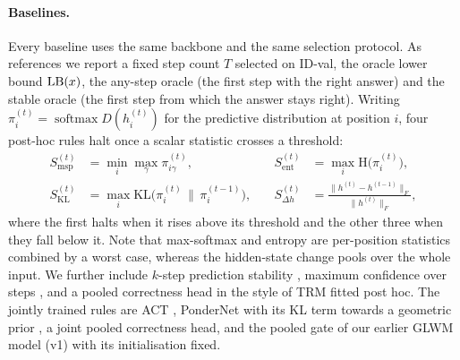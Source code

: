 \paragraph{Baselines.} Every baseline uses the same backbone and the same selection protocol. As
references we report a fixed step count $T$ selected on ID-val, the oracle lower bound $\operatorname{LB}(x)$, the
any-step oracle (the first step with the right answer) and the stable oracle (the first step from which
the answer stays right). Writing $\pi_i^{(t)} = \operatorname{softmax}D(h_i^{(t)})$ for the predictive
distribution at position $i$, four post-hoc rules halt once a scalar statistic crosses a threshold:
\begin{equation}
  \begin{aligned}
    S_{\mathrm{msp}}^{(t)} &= \min_i \max_\gamma \pi_{i\gamma}^{(t)}, &\quad
    S_{\mathrm{ent}}^{(t)} &= \max_i \mathrm{H}\bigl(\pi_i^{(t)}\bigr),\\
    S_{\mathrm{KL}}^{(t)} &= \max_i \mathrm{KL}\bigl(\pi_i^{(t)}\,\big\|\,\pi_i^{(t-1)}\bigr), &\quad
    S_{\Delta h}^{(t)} &= \frac{\lVert h^{(t)}-h^{(t-1)}\rVert_F}{\lVert h^{(t)}\rVert_F},
  \end{aligned}
  \label{eq:posthoc}
\end{equation}
where the first halts when it rises above its threshold and the other three when they fall below it.
Note that max-softmax and entropy are per-position statistics combined by a worst case, whereas the
hidden-state change pools over the whole input. We further include $k$-step prediction stability
\citep{zhou2020pabee}, maximum confidence over steps \citep{fan2025looped}, and a pooled correctness head
in the style of TRM \citep{jolicoeur2025trm} fitted post hoc. The jointly
trained rules are ACT \citep{graves2016act}, PonderNet with its KL term towards a geometric prior
\citep{banino2021pondernet}, a joint pooled correctness head, and the pooled gate of our earlier GLWM
model (v1) with its initialisation fixed.
